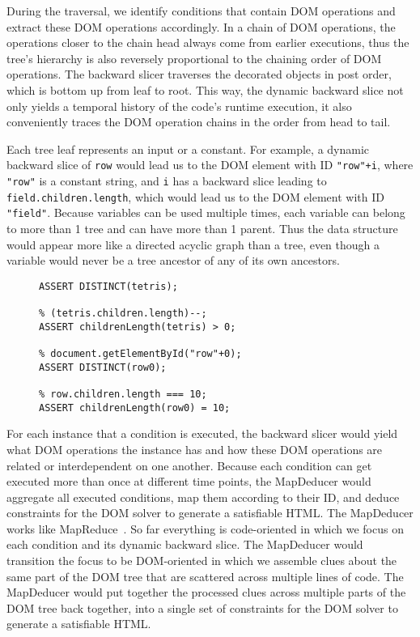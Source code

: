 During the traversal, we identify conditions that contain DOM operations and extract these DOM operations accordingly.  
In a chain of DOM operations, the operations closer to the chain head always come from earlier executions, thus the tree's hierarchy is also reversely proportional to the chaining order of DOM operations.  
The backward slicer traverses the decorated objects in post order, which is bottom up from leaf to root.  
This way, the dynamic backward slice not only yields a temporal history of the code's runtime execution, it also conveniently traces the DOM operation chains in the order from head to tail.

Each tree leaf represents an input or a constant.  
For example, a dynamic backward slice of {\tt row} would lead us to the DOM element with ID {\tt "row"+i}, where {\tt "row"} is a constant string, 
and {\tt i} has a backward slice leading to {\tt field.children.length}, which would lead us to the DOM element with ID {\tt "field"}.  
Because variables can be used multiple times, each variable can belong to more than 1 tree and can have more than 1 parent.  
Thus the data structure would appear more like a directed acyclic graph than a tree, even though a variable would never be a tree ancestor of any of its own ancestors.  

\begin{figure}
\begin{lstlisting}[caption=DOM constraints for generating an HTML that would satisfy for going the {\tt True} branch in the {\tt if} statement of Sample Code ~\ref{dom0}.  The constraints are shown in the input format for the CVC~\cite{cvc3} implementation of the SMT solver. {\tt \%} is the comment operator in CVC.,label=constraints0]
% document.getElementById("tetris");
ASSERT DISTINCT(tetris);

% (tetris.children.length)--;
ASSERT childrenLength(tetris) > 0;

% document.getElementById("row"+0);
ASSERT DISTINCT(row0);

% row.children.length === 10;
ASSERT childrenLength(row0) = 10;
\end{lstlisting}
\end{figure}

For each instance that a condition is executed, the backward slicer would yield what DOM operations the instance has and how these DOM operations are related or interdependent on one another.  
Because each condition can get executed more than once at different time points, the MapDeducer would aggregate all executed conditions, map them according to their ID, and deduce constraints for the DOM solver to generate a satisfiable HTML.  
The MapDeducer works like MapReduce~\cite{mapreduce}.  So far everything is code-oriented in which we focus on each condition and its dynamic backward slice.  The MapDeducer would transition the focus to be DOM-oriented in which we assemble clues about the same part of the DOM tree that are scattered across multiple lines of code.  
The MapDeducer would put together the processed clues across multiple parts of the DOM tree back together, into a single set of constraints for the DOM solver to generate a satisfiable HTML.

